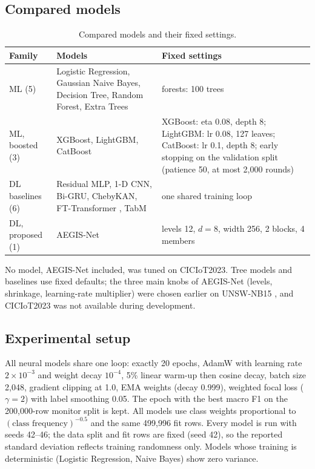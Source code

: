 \documentclass[11pt,a4paper]{article}
\newcommand{\aegis}{AEGIS-Net}
\begin{document}
\subsection{Compared models}
\begin{table}[h]
\centering\small
\caption{Compared models and their fixed settings.}\label{tab:models}
\begin{tabularx}{\textwidth}{@{}lXX@{}}
\toprule
Family & Models & Fixed settings \\
\midrule
ML (5) & Logistic Regression, Gaussian Naive Bayes, Decision Tree, Random Forest, Extra Trees & forests: 100 trees \\
ML, boosted (3) & XGBoost, LightGBM, CatBoost \cite{chen2016xgboost,ke2017lightgbm,prokhorenkova2018catboost} & XGBoost: eta 0.08, depth 8; LightGBM: lr 0.08, 127 leaves; CatBoost: lr 0.1, depth 8; early stopping on the validation split (patience 50, at most 2{,}000 rounds) \\
DL baselines (6) & Residual MLP, 1-D CNN, Bi-GRU, ChebyKAN, FT-Transformer \cite{gorishniy2021revisiting}, TabM \cite{gorishniy2025tabm} & one shared training loop \\
DL, proposed (1) & \aegis & levels 12, $d=8$, width 256, 2 blocks, 4 members \\
\bottomrule
\end{tabularx}
\end{table}
No model, \aegis{} included, was tuned on CICIoT2023. Tree models and baselines use fixed defaults; the three main knobs of \aegis{} (levels, shrinkage, learning-rate multiplier) were chosen earlier on UNSW-NB15 \cite{moustafa2015unsw}, and CICIoT2023 was not available during development.

\subsection{Experimental setup}
All neural models share one loop: exactly 20 epochs, AdamW \cite{loshchilov2019adamw} with learning rate $2\times10^{-3}$ and weight decay $10^{-4}$, 5\% linear warm-up then cosine decay, batch size 2{,}048, gradient clipping at 1.0, EMA weights (decay 0.999), weighted focal loss \cite{lin2017focal} ($\gamma=2$) with label smoothing 0.05. The epoch with the best macro F1 on the 200{,}000-row monitor split is kept. All models use class weights proportional to $(\text{class frequency})^{-0.5}$ and the same 499{,}996 fit rows. Every model is run with seeds 42--46; the data split and fit rows are fixed (seed 42), so the reported standard deviation reflects training randomness only. Models whose training is deterministic (Logistic Regression, Naive Bayes) show zero variance.
\end{document}
